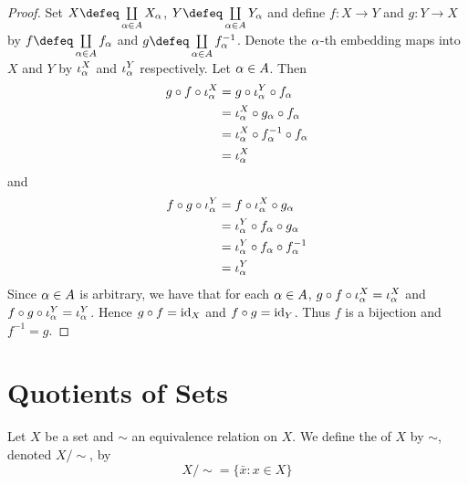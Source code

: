 \documentclass{book}
\begin{document}
	\begin{proof}
		Set $X \defeq \coprod\limits_{\al \in A} X_{\al}$, $Y \defeq \coprod\limits_{\al \in A}Y_{\al}$ and define $f: X \rightarrow Y$ and $g: Y \rightarrow X$ by $f \defeq \coprod\limits_{\al \in A} f_{\al}$ and $g \defeq \coprod\limits_{\al \in A} f_{\al}^{-1}$. Denote the $\alpha$-th embedding maps into $X$ and $Y$ by $\iota^X_{\alpha}$ and $\iota^Y_{\alpha}$ respectively. Let $\alpha \in A$. Then
		\begin{align*}
			g \circ f \circ \iota_{\alpha}^X
			& = g \circ \iota_{\alpha}^Y \circ f_{\alpha} \\
			& = \iota_{\alpha}^X \circ g_{\alpha} \circ f_{\alpha} \\
			& = \iota_{\alpha}^X \circ f_{\alpha}^{-1} \circ f_{\alpha} \\
			& = \iota_{\alpha}^X 
		\end{align*}
		and 
		\begin{align*}
			f \circ g \circ \iota_{\alpha}^Y
			& = f \circ \iota_{\alpha}^X \circ g_{\alpha} \\
			& = \iota_{\alpha}^Y \circ f_{\alpha} \circ g_{\alpha} \\
			& = \iota_{\alpha}^Y \circ f_{\alpha} \circ f_{\alpha}^{-1} \\
			& = \iota_{\alpha}^Y 
		\end{align*}
		Since $\alpha \in A$ is arbitrary, we have that for each $\alpha \in A$, $g \circ f \circ \iota_{\alpha}^X = \iota_{\alpha}^X$ and $f \circ g \circ \iota_{\alpha}^Y = \iota_{\alpha}^Y$. Hence $g \circ f = \operatorname{id}_X$ and $f \circ g = \operatorname{id}_Y$. Thus $f$ is a bijection and $f^{-1} = g$. 
	\end{proof}
	
	
	
	
	
	
	
	
	
	
	
	
	
	
	
	
	
	
	
	
	
	
	
	
	
	
	
	
	
	
	
	\newpage
	\section{Quotients of Sets}
	
	\begin{defn}
	Let $X$ be a set and $\sim$ an equivalence relation on $X$. We define the  of $X$ by $\sim$, denoted $X/ {\sim}$, by 
	\begin{equation*}
	X/ {\sim} = \{\bar{x}: x \in X\}
	\end{equation*}
	\end{defn}
\end{document}
